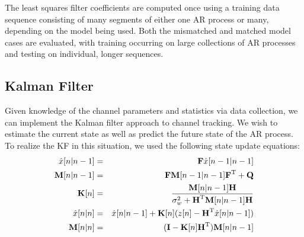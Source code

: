 \documentclass[twocolumn,letterpaper]{IEEEAerospaceCLS}  %
\begin{document}
The least squares filter coefficients are computed once using a training data sequence consisting of many segments of either one AR process or many, depending on the model being used. Both the mismatched and matched model cases are evaluated, with training occurring on large collections of AR processes and testing on individual, longer sequences. 


\subsection{Kalman Filter}

Given knowledge of the channel parameters and statistics via data collection, we can implement the Kalman filter approach to channel tracking. We wish to estimate the current state as well as predict the future state of the AR process. To realize the KF in this situation, we used the following state update equations: \\
\begin{eqnarray*}
\hat{x}[n|n-1]&=&\textbf{F}\hat{x}[n-1|n-1] \\
\textbf{M}[n|n-1]&=&\textbf{FM}[n-1|n-1]\textbf{F}^{\rm T} + \textbf{Q} \\
\textbf{K}[n]&=&\frac{\textbf{M}[n|n-1]\textbf{H}}{\sigma_{w}^{2} + \textbf{H}^{\rm T}\textbf{M}[n|n-1]\textbf{H}} \\
\hat{x}[n|n]&=&\hat{x}[n|n-1] + \textbf{K}[n](z[n]-\textbf{H}^{\rm T}\hat{x}[n|n-1]) \\
\textbf{M}[n|n]&=&(\textbf{I}-\textbf{K}[n]\textbf{H}^{\rm T})\textbf{M}[n|n-1]
\end{eqnarray*}
\end{document}
